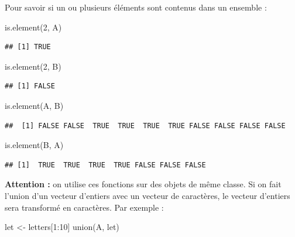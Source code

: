 \documentclass[
]{book}
\newenvironment{Shaded}{\begin{snugshade}}{\end{snugshade}}
\newcommand{\DecValTok}[1]{\textcolor[rgb]{0.00,0.00,0.81}{#1}}
\newcommand{\FunctionTok}[1]{\textcolor[rgb]{0.00,0.00,0.00}{#1}}
\newcommand{\NormalTok}[1]{#1}
\newcommand{\OtherTok}[1]{\textcolor[rgb]{0.56,0.35,0.01}{#1}}
\newcommand{\SpecialCharTok}[1]{\textcolor[rgb]{0.00,0.00,0.00}{#1}}
\theoremstyle{definition}
\theoremstyle{definition}
\theoremstyle{definition}
\theoremstyle{definition}
\theoremstyle{remark}
\begin{document}
Pour savoir si un ou plusieurs éléments sont contenus dans un ensemble :

\begin{Shaded}
\begin{Highlighting}[]
\FunctionTok{is.element}\NormalTok{(}\DecValTok{2}\NormalTok{, A)}
\end{Highlighting}
\end{Shaded}

\begin{verbatim}
## [1] TRUE
\end{verbatim}

\begin{Shaded}
\begin{Highlighting}[]
\FunctionTok{is.element}\NormalTok{(}\DecValTok{2}\NormalTok{, B)}
\end{Highlighting}
\end{Shaded}

\begin{verbatim}
## [1] FALSE
\end{verbatim}

\begin{Shaded}
\begin{Highlighting}[]
\FunctionTok{is.element}\NormalTok{(A, B)}
\end{Highlighting}
\end{Shaded}

\begin{verbatim}
##  [1] FALSE FALSE  TRUE  TRUE  TRUE  TRUE FALSE FALSE FALSE FALSE
\end{verbatim}

\begin{Shaded}
\begin{Highlighting}[]
\FunctionTok{is.element}\NormalTok{(B, A)}
\end{Highlighting}
\end{Shaded}

\begin{verbatim}
## [1]  TRUE  TRUE  TRUE  TRUE FALSE FALSE FALSE
\end{verbatim}

\textbf{Attention :} on utilise ces fonctions sur des objets de même classe. Si on fait l'union d'un vecteur d'entiers avec un vecteur de caractères, le vecteur d'entiers sera transformé en caractères. Par exemple :

\begin{Shaded}
\begin{Highlighting}[]
\NormalTok{let }\OtherTok{\textless{}{-}}\NormalTok{ letters[}\DecValTok{1}\SpecialCharTok{:}\DecValTok{10}\NormalTok{]}
\FunctionTok{union}\NormalTok{(A, let)}
\end{Highlighting}
\end{Shaded}
\end{document}
